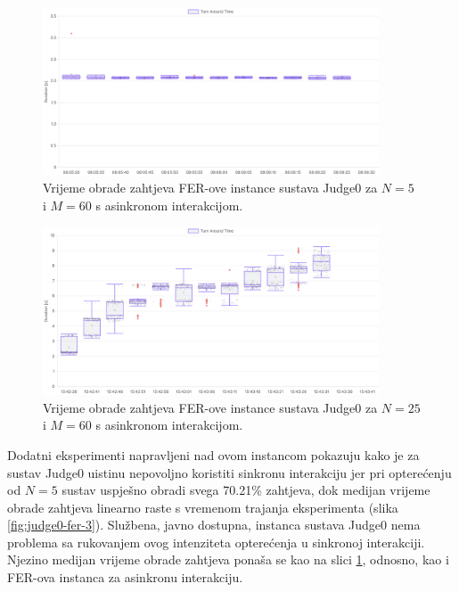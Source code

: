 \documentclass[times, utf8, diplomski]{fer}
\begin{document}
\begin{figure}[htb]
	\centering
	\includegraphics[width=0.89\textwidth]{images/Judge0 FER TAT for 5 5s.png}
	\caption{
		Vrijeme obrade zahtjeva FER-ove instance sustava Judge0 za $N=5$ i $M=60$ s asinkronom interakcijom.
	}
	\label{fig:judge0-fer-1}
\end{figure}

\begin{figure}[htb]
	\centering
	\includegraphics[width=0.89\textwidth]{images/Judge0 FER TAT for 25 5s.png}
	\caption{
		Vrijeme obrade zahtjeva FER-ove instance sustava Judge0 za $N=25$ i $M=60$ s asinkronom interakcijom.
	}
	\label{fig:judge0-fer-2}
\end{figure}

Dodatni eksperimenti napravljeni nad ovom instancom pokazuju kako je za sustav Judge0 uistinu nepovoljno koristiti sinkronu interakciju jer pri opterećenju od $N=5$ sustav uspješno obradi svega 70.21\% zahtjeva, dok medijan vrijeme obrade zahtjeva linearno raste s vremenom trajanja eksperimenta (slika \ref{fig:judge0-fer-3}). Službena, javno dostupna, instanca sustava Judge0 \citep{Judge0CE} nema problema sa rukovanjem ovog intenziteta opterećenja u sinkronoj interakciji. Njezino medijan vrijeme obrade zahtjeva ponaša se kao na slici \ref{fig:judge0-fer-1}, odnosno, kao i FER-ova instanca za asinkronu interakciju.
\end{document}

